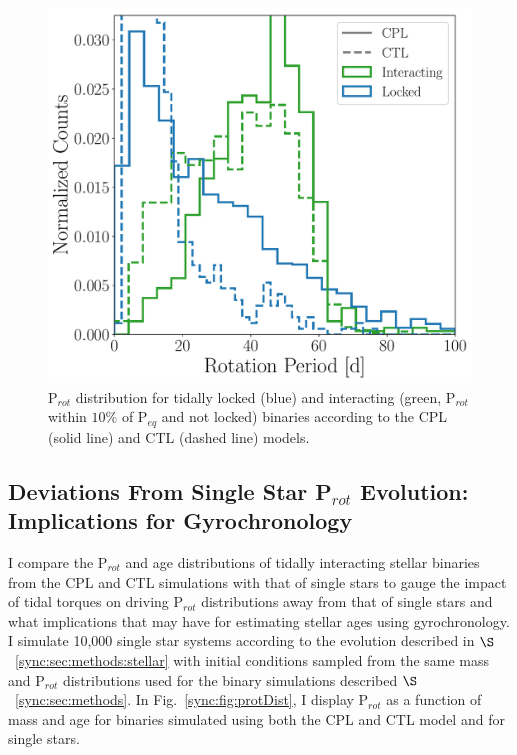 \begin{figure}
	\includegraphics[width=\columnwidth]{lockedProtHist.pdf}
   \caption{P$_{rot}$ distribution for tidally locked (blue) and interacting (green, P$_{rot}$ within $10\%$ of P$_{eq}$ and not locked) binaries according to the CPL (solid line) and CTL (dashed line) models.}%
    \label{sync:fig:lockedProtHist}%
\end{figure}

\subsection{Deviations From Single Star P$_{rot}$ Evolution: Implications for Gyrochronology} \label{sync:sec:gyro}

I compare the P$_{rot}$ and age distributions of tidally interacting stellar binaries from the CPL and CTL simulations with that of single stars to gauge the impact of tidal torques on driving P$_{rot}$ distributions away from that of single stars and what implications that may have for estimating stellar ages using gyrochronology.  I simulate 10,000 single star systems according to the evolution described in $\S$~\ref{sync:sec:methods:stellar} with initial conditions sampled from the same mass and P$_{rot}$ distributions used for the binary simulations described $\S$~\ref{sync:sec:methods}. In Fig.~\ref{sync:fig:protDist}, I display P$_{rot}$ as a function of mass and age for binaries simulated using both the CPL and CTL model and for single stars.

